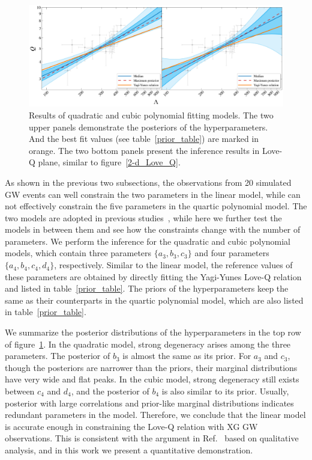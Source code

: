 \documentclass[a4paper,11pt]{article}
\begin{document}
\begin{figure}
    \begin{minipage}[t]{\textwidth}
    \includegraphics[width=\linewidth]{hierarchical_results_APR4_3d.pdf}
    \end{minipage}
    \caption{\label{3-d_4-d_Love_Q} Results of quadratic and cubic polynomial 
    fitting models. The two upper panels demonstrate the posteriors of the 
    hyperparameters. And the best fit values (see table~\ref{prior_table}) are 
    marked in orange. The two bottom panels present the inference results in 
    Love-Q plane, similar to figure~\ref{2-d_Love_Q}.
    }
\end{figure}
As shown in the previous two subsections, the observations from 20 simulated GW 
events can well constrain the two parameters in the linear model, while can not 
effectively constrain the five parameters in the quartic polynomial model. The two 
models are adopted in previous studies~\cite{Yagi:2013awa, Samajdar:2020xrd}, 
while here we further test the models in between them and see how the constraints 
change with the number of parameters. We perform the inference for the quadratic 
and cubic polynomial models, which contain three parameters $\{a_3, b_3, c_3\}$ 
and four parameters $\{a_4, b_4, c_4, d_4\}$, respectively. Similar to the linear 
model, the reference values of these parameters are obtained by directly fitting 
the Yagi-Yunes Love-Q relation and listed in table~\ref{prior_table}. The priors of the
hyperparameters keep the same as their counterparts in the quartic polynomial 
model, which are also listed in table~\ref{prior_table}.

We summarize the posterior distributions of the hyperparameters in the top row of 
figure~\ref{3-d_4-d_Love_Q}. In the quadratic model, strong degeneracy arises 
among the three parameters. The posterior of $b_3$ is almost the same as its 
prior. For $a_3$ and $c_3$, though the posteriors are narrower than the priors, 
their marginal distributions have very wide and flat peaks. In the cubic model, 
strong degeneracy still exists between $c_4$ and $d_4$, and the posterior of $b_4$ 
is also similar to its prior. Usually, posterior with large correlations and 
prior-like marginal distributions indicates redundant parameters in the model. 
Therefore, we conclude that the linear model is accurate enough in constraining 
the Love-Q relation with XG GW observations. This is consistent with the argument 
in Ref.~\cite{Samajdar:2020xrd} based on qualitative analysis, and in this work we present a quantitative demonstration. 
\end{document}
